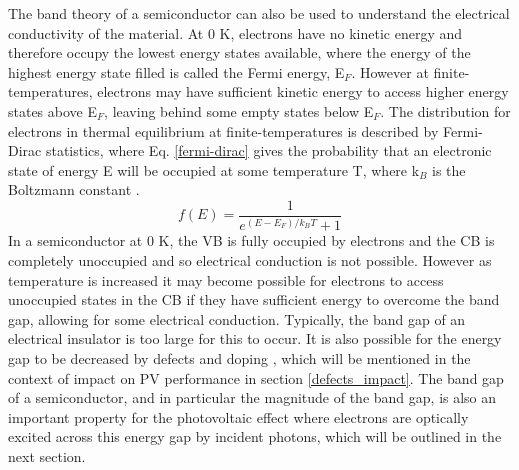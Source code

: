 \documentclass[11pt, twoside]{report}
\begin{document}

The band theory of a semiconductor can also be used to understand the electrical conductivity of the material. At 0 K, electrons have no kinetic energy and therefore occupy the lowest energy states available, where the energy of the highest energy state filled is called the Fermi energy, E$_F$. However at finite-temperatures, electrons may have sufficient kinetic energy to access higher energy states above E$_F$, leaving behind some empty states below E$_F$. The distribution for electrons in thermal equilibrium at finite-temperatures is described by Fermi-Dirac statistics, where Eq. \ref{fermi-dirac} gives the probability that an electronic state of energy E will be occupied at some temperature T, where k$_B$ is the Boltzmann constant \cite{Nelson3}.
\begin{equation}\label{fermi-dirac}
f(E) = \frac{1}{e^{(E-E_F)/k_BT}+1}
\end{equation}
In a semiconductor at 0 K, the VB is fully occupied by electrons and the CB is completely unoccupied and so electrical conduction is not possible. However as temperature is increased it may become possible for electrons to access unoccupied states in the CB if they have sufficient energy to overcome the band gap, allowing for some electrical conduction. Typically, the band gap of an electrical insulator is too large for this to occur. It is also possible for the energy gap to be decreased by defects and doping \cite{Nelson3}, which will be mentioned in the context of impact on PV performance in section \ref{defects_impact}. The band gap of a semiconductor, and in particular the magnitude of the band gap, is also an important property for the photovoltaic effect where electrons are optically excited across this energy gap by incident photons, which will be outlined in the next section.

\end{document}
